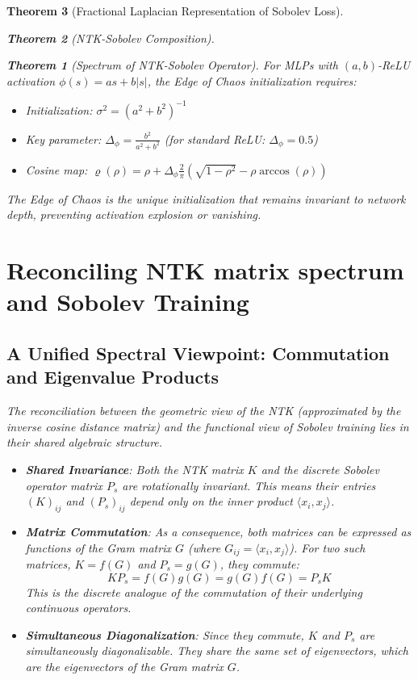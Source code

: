 \documentclass{article}
\newtheorem{theorem}{Theorem}[section]
\begin{document}
\begin{theorem}[Fractional Laplacian Representation of Sobolev Loss]
\begin{theorem}[NTK-Sobolev Composition]
\begin{theorem}[Spectrum of NTK-Sobolev Operator]
For MLPs with $(a,b)$-ReLU activation $\phi(s) = as + b|s|$, the Edge of Chaos initialization requires:
\begin{itemize}
\item Initialization: $\sigma^2 = (a^2+b^2)^{-1}$
\item Key parameter: $\Delta_\phi = \frac{b^2}{a^2+b^2}$ (for standard ReLU: $\Delta_\phi = 0.5$)
\item Cosine map: $\varrho(\rho) = \rho + \Delta_\phi \frac{2}{\pi}\left( \sqrt{1-\rho^2} - \rho \arccos(\rho) \right)$
\end{itemize}

The Edge of Chaos is the unique initialization that remains invariant to network depth, preventing activation explosion or vanishing.

\section{Reconciling NTK matrix spectrum and Sobolev Training}

\subsection{A Unified Spectral Viewpoint: Commutation and Eigenvalue Products}

The reconciliation between the geometric view of the NTK (approximated by the inverse cosine distance matrix) and the functional view of Sobolev training lies in their shared algebraic structure.

\begin{itemize}
    \item \textbf{Shared Invariance}: Both the NTK matrix $K$ and the discrete Sobolev operator matrix $P_s$ are rotationally invariant. This means their entries $(K)_{ij}$ and $(P_s)_{ij}$ depend only on the inner product $\langle x_i, x_j \rangle$.
    
    \item \textbf{Matrix Commutation}: As a consequence, both matrices can be expressed as functions of the Gram matrix $G$ (where $G_{ij} = \langle x_i, x_j \rangle$). For two such matrices, $K=f(G)$ and $P_s=g(G)$, they commute:
    \[ K P_s = f(G)g(G) = g(G)f(G) = P_s K \]
    This is the discrete analogue of the commutation of their underlying continuous operators.
    
    \item \textbf{Simultaneous Diagonalization}: Since they commute, $K$ and $P_s$ are simultaneously diagonalizable. They share the same set of eigenvectors, which are the eigenvectors of the Gram matrix $G$.
    

\end{itemize}
\end{theorem}
\end{theorem}
\end{theorem}
\end{document}
